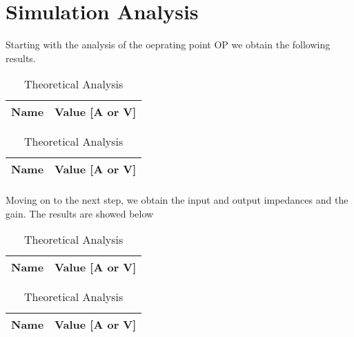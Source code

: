 \section{Simulation Analysis}
\label{sec:simulation}

Starting with the analysis of the oeprating point OP we obtain the following results.

\begin{table}[!htb]
    \begin{minipage}{0.5\linewidth}
        \centering
        \caption{Simulation Analysis}
        \begin{tabular}{|l|l|}
            \hline
            {\bf Name} & {\bf Value [A or V]} \\ \hline
            
        \end{tabular}
        \label{tab:tabela4}
    \end{minipage}%
    \begin{minipage}{0.5\linewidth}
        \centering
        \caption{Theoretical Analysis}
        \begin{tabular}{|l|l|}
            \hline
            {\bf Name} & {\bf Value [A or V]} \\ \hline
            
            
        \end{tabular}
    \end{minipage}
\end{table}

\paragraph{} Moving on to the next step, we obtain the input and output impedances and the gain.
The results are showed below

\begin{table}[!htb]
    \begin{minipage}{.5\linewidth}
        \centering
        \caption{Simulation Analysis}
        \begin{tabular}{|l|l|}
            \hline
            {\bf Name} & {\bf Value [A or V]} \\ \hline
            
        \end{tabular}
        \label{tab:tabela4}
    \end{minipage}
    \begin{minipage}{0.5\linewidth}
        \centering
        \caption{Theoretical Analysis}
        \begin{tabular}{|l|l|}
            \hline
            {\bf Name} & {\bf Value [A or V]} \\ \hline
            
            
        \end{tabular}
    \end{minipage}
\end{table}

